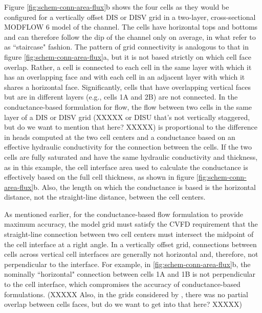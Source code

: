 \documentclass{article}
\begin{document}
Figure \ref{fig:schem-conn-area-flux}b shows the four cells as they would be configured for a vertically offset DIS or DISV grid in a two-layer, cross-sectional MODFLOW 6 model of the channel. The cells have horizontal tops and bottoms and can therefore follow the dip of the channel only on average, in what \cite{bardot2022} refer to as ``staircase" fashion. The pattern of grid connectivity is analogous to that in figure \ref{fig:schem-conn-area-flux}a, but it is not based strictly on which cell face overlap. Rather, a cell is connected to each cell in the same layer with which it has an overlapping face and with each cell in an adjacent layer with which it shares a horizontal face. Significantly, cells that have overlapping vertical faces but are in different layers (e.g., cells 1A and 2B) are not connected. In the conductance-based formulation for flow, the flow between two cells in the same layer of a DIS or DISV grid (XXXXX or DISU that's not vertically staggered, but do we want to mention that here? XXXXX) is proportional to the difference in heads computed at the two cell centers and a conductance based on an effective hydraulic conductivity for the connection between the cells. If the two cells are fully saturated and have the same hydraulic conductivity and thickness, as in this example, the cell interface area used to calculate the conductance is effectively based on the full cell thickness, as shown in figure \ref{fig:schem-conn-area-flux}b. Also, the length on which the conductance is based is the horizontal distance, not the straight-line distance, between the cell centers.

As mentioned earlier, for the conductance-based flow formulation to provide maximum accuracy, the model grid must satisfy the CVFD requirement that the straight-line connection between two cell centers must intersect the midpoint of the cell interface at a right angle. In a vertically offset grid, connections between cells across vertical cell interfaces are generally not horizontal and, therefore, not perpendicular to the interface. For example, in \ref{fig:schem-conn-area-flux}b, the nominally ``horizontal" connection between cells 1A and 1B is not perpendicular to the cell interface, which compromises the accuracy of conductance-based formulations.  (XXXXX Also, in the grids considered by \cite{narasimhan1976integrated}, there was no partial overlap between cells faces, but do we want to get into that here? XXXXX)
\end{document}
